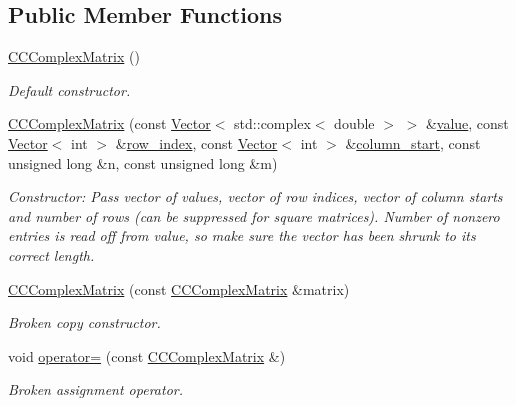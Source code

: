 \subsection*{Public Member Functions}
\begin{DoxyCompactItemize}
\item 
\hyperlink{classoomph_1_1CCComplexMatrix_a5978332570ff5adabc1e185edc240398}{C\+C\+Complex\+Matrix} ()
\begin{DoxyCompactList}\small\item\em Default constructor. \end{DoxyCompactList}\item 
\hyperlink{classoomph_1_1CCComplexMatrix_a3b354aedafe10d75bda23ce1e34e2971}{C\+C\+Complex\+Matrix} (const \hyperlink{classoomph_1_1Vector}{Vector}$<$ std\+::complex$<$ double $>$ $>$ \&\hyperlink{classoomph_1_1SparseMatrix_a3e382ff145082821a6b0b3e63b6aed5d}{value}, const \hyperlink{classoomph_1_1Vector}{Vector}$<$ int $>$ \&\hyperlink{classoomph_1_1CCMatrix_acbea54ff48550342267246b7ae07c8c4}{row\+\_\+index}, const \hyperlink{classoomph_1_1Vector}{Vector}$<$ int $>$ \&\hyperlink{classoomph_1_1CCMatrix_a955390de47c08eb8799550519a1a2751}{column\+\_\+start}, const unsigned long \&n, const unsigned long \&m)
\begin{DoxyCompactList}\small\item\em Constructor\+: Pass vector of values, vector of row indices, vector of column starts and number of rows (can be suppressed for square matrices). Number of nonzero entries is read off from value, so make sure the vector has been shrunk to its correct length. \end{DoxyCompactList}\item 
\hyperlink{classoomph_1_1CCComplexMatrix_aee92c78d8715e0221d8db215609e7c3c}{C\+C\+Complex\+Matrix} (const \hyperlink{classoomph_1_1CCComplexMatrix}{C\+C\+Complex\+Matrix} \&matrix)
\begin{DoxyCompactList}\small\item\em Broken copy constructor. \end{DoxyCompactList}\item 
void \hyperlink{classoomph_1_1CCComplexMatrix_a95c58231d17ca240a62f9398118cd433}{operator=} (const \hyperlink{classoomph_1_1CCComplexMatrix}{C\+C\+Complex\+Matrix} \&)
\begin{DoxyCompactList}\small\item\em Broken assignment operator. \end{DoxyCompactList}\item 

\end{DoxyCompactItemize}
